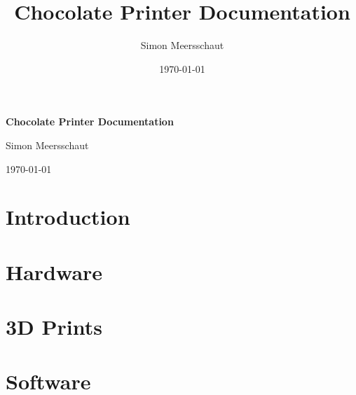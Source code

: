 \documentclass{article}
\title{Chocolate Printer Documentation}
\author{Simon Meersschaut}
\date{\today}
\begin{document}
\begin{titlepage}
\centering
\vspace*{\fill}
{\Huge \textbf{Chocolate Printer Documentation} \par}
\vspace{1cm}
{\Large Simon Meersschaut \par}
\vspace{0.5cm}
{\Large \today \par}
\vspace*{\fill}
\end{titlepage}

\tableofcontents

\newpage

\section{Introduction}


\newpage

\section{Hardware}


\newpage

\section{3D Prints}


\newpage

\section{Software}


\newpage


\end{document}
